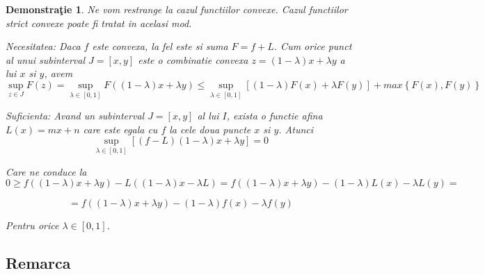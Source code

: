 \documentclass[a4paper,12pt,oneside]{report}
\newtheorem{demonstration}{Demonstra\c tie}
\begin{document}
\begin{demonstration}
Ne vom restrange la cazul functiilor convexe. Cazul functiilor strict convexe poate fi tratat in acelasi mod. 

Necesitatea: Daca \(f\) este convexa, la fel este si suma \(F = f + L\). Cum orice punct al unui subinterval \(J = \left [ x , y \right ]\) este o combinatie convexa \(z = \left ( 1 - \lambda  \right )x + \lambda y \) a lui \(x\) si \(y\), avem
\begin{displaymath}
  \sup_{z\in J}F\left ( z \right ) = \sup_{\lambda \in \left [ 0 , 1 \right ]}F\left ( \left ( 1 - \lambda  \right )x + \lambda y \right )\leq \sup_{\lambda \in \left [ 0,1 \right ]}\left [ \left ( 1-\lambda  \right )F\left ( x \right ) + \lambda F\left ( y \right ) \right ] + max \left \{ F\left ( x \right ), F\left ( y \right ) \right \}
\end{displaymath}

Suficienta: Avand un subinterval \(J = \left [ x,y \right ]\) al lui \(I\), exista o functie afina \(L\left ( x \right ) = mx + n\) care este egala cu \(f\) la cele doua puncte  \(x\) si \(y\). 
Atunci
\begin{displaymath}
  \sup_{\lambda \in \left [ 0,1 \right ]}\left [ \left ( f - L \right )\left ( 1 - \lambda  \right )x + \lambda y \right ] = 0
\end{displaymath}

Care ne conduce la 
\begin{displaymath}
  0\geq f\left ( \left ( 1 - \lambda  \right )x + \lambda y \right )- L\left ( \left ( 1 - \lambda  \right )x - \lambda L \right )= f\left ( \left ( 1 - \lambda  \right )x + \lambda y  \right ) - \left ( 1 - \lambda  \right )L\left ( x \right ) - \lambda L\left ( y \right ) =
\end{displaymath}

\begin{displaymath}
  = f\left ( \left ( 1 - \lambda  \right )x + \lambda y \right ) - \left ( 1 - \lambda  \right ) f\left ( x \right ) - \lambda f \left ( y \right )
\end{displaymath}


Pentru orice \(\lambda \in \left [ 0,1 \right ]\). 

\end{demonstration}

\subsection{Remarca}
\end{document}
